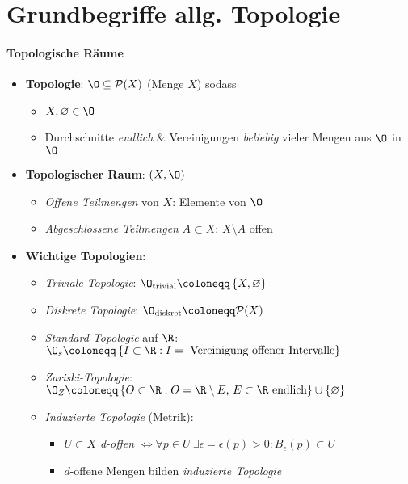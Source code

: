 \section{Grundbegriffe allg. Topologie}

\paragraph{Topologische Räume}
\begin{itemize}
  \item \textbf{Topologie}: \( \O \subseteq \mathcal{P}(X) \) (Menge \( X \)) sodass
  \begin{itemize}
    \item \( X, \varnothing \in \O \)
    \item Durchschnitte \emph{endlich} \& Vereinigungen \emph{beliebig} vieler Mengen aus \( \O \) in \( \O \)
  \end{itemize}
  \item \textbf{Topologischer Raum}: \( \left( X, \O \right) \)
  \begin{itemize}
    \item \emph{Offene Teilmengen} von \( X \): Elemente von \( \O \)
    \item \emph{Abgeschlossene Teilmengen} \( A \subset X \): \( X \setminus A \) offen
  \end{itemize}
  \item \textbf{Wichtige Topologien}:
  \begin{itemize}
    \item \emph{Triviale Topologie}: \( \O_{\text{trivial}} \coloneqq \left \{ X, \varnothing \right \} \)
    \item \emph{Diskrete Topologie}: \( \O_{\text{diskret}} \coloneqq \mathcal{P}(X) \)
    \item \emph{Standard-Topologie} auf \( \R \): \( \O_s \coloneqq \left \{ I \subset \R : I = \text{ Vereinigung offener Intervalle} \right \} \)
    \item \emph{Zariski-Topologie}: \( \O_Z \coloneqq \left \{ O \subset \R : O = \R \setminus E\text{, } E \subset \R \text{ endlich} \right \} \cup \left \{ \varnothing \right \} \)
    \item \emph{Induzierte Topologie} (Metrik):
    \begin{itemize}
      \item \( U \subset X \) \emph{d-offen} \( \Leftrightarrow \forall p \in U \ \exists \epsilon = \epsilon(p) > 0 : B_\epsilon(p) \subset U \)
      \item \( d \)-offene Mengen bilden \emph{induzierte Topologie}

\end{itemize}
\end{itemize}
\end{itemize}
